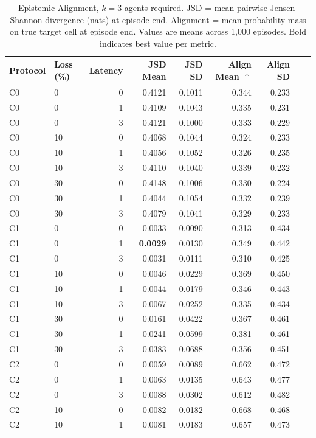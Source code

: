 \documentclass[pdflatex,sn-mathphys-num]{sn-jnl}%
\theoremstyle{thmstyleone}%
\theoremstyle{thmstyletwo}%
\theoremstyle{thmstylethree}%
\begin{document}
\begin{appendices}
\begin{table}
\centering
\caption{Epistemic Alignment, $k=3$ agents required. JSD = mean pairwise Jensen-Shannon divergence (nats) at episode end. Alignment = mean probability mass on true target cell at episode end. Values are means across 1,000 episodes. Bold indicates best value per metric.}
\label{tab:appendix_epistemic_b}
\small
\begin{tabular}{llrrrrrrr}
\toprule
Protocol & Loss (\%) & Latency & JSD Mean & JSD SD & Align Mean $\uparrow$ & Align SD \\
\midrule
C0 & 0 & 0 & 0.4121 & 0.1011 & 0.344 & 0.233 \\
C0 & 0 & 1 & 0.4109 & 0.1043 & 0.335 & 0.231 \\
C0 & 0 & 3 & 0.4121 & 0.1000 & 0.333 & 0.229 \\
C0 & 10 & 0 & 0.4068 & 0.1044 & 0.324 & 0.233 \\
C0 & 10 & 1 & 0.4056 & 0.1052 & 0.326 & 0.235 \\
C0 & 10 & 3 & 0.4110 & 0.1040 & 0.339 & 0.232 \\
C0 & 30 & 0 & 0.4148 & 0.1006 & 0.330 & 0.224 \\
C0 & 30 & 1 & 0.4044 & 0.1054 & 0.332 & 0.239 \\
C0 & 30 & 3 & 0.4079 & 0.1041 & 0.329 & 0.233 \\
\addlinespace[4pt]
C1 & 0 & 0 & 0.0033 & 0.0090 & 0.313 & 0.434 \\
C1 & 0 & 1 & \textbf{0.0029} & 0.0130 & 0.349 & 0.442 \\
C1 & 0 & 3 & 0.0031 & 0.0111 & 0.310 & 0.425 \\
C1 & 10 & 0 & 0.0046 & 0.0229 & 0.369 & 0.450 \\
C1 & 10 & 1 & 0.0044 & 0.0179 & 0.346 & 0.443 \\
C1 & 10 & 3 & 0.0067 & 0.0252 & 0.335 & 0.434 \\
C1 & 30 & 0 & 0.0161 & 0.0422 & 0.367 & 0.461 \\
C1 & 30 & 1 & 0.0241 & 0.0599 & 0.381 & 0.461 \\
C1 & 30 & 3 & 0.0383 & 0.0688 & 0.356 & 0.451 \\
\addlinespace[4pt]
C2 & 0 & 0 & 0.0059 & 0.0089 & 0.662 & 0.472 \\
C2 & 0 & 1 & 0.0063 & 0.0135 & 0.643 & 0.477 \\
C2 & 0 & 3 & 0.0088 & 0.0302 & 0.612 & 0.482 \\
C2 & 10 & 0 & 0.0082 & 0.0182 & 0.668 & 0.468 \\
C2 & 10 & 1 & 0.0081 & 0.0183 & 0.657 & 0.473 \\

\end{tabular}
\end{table}
\end{appendices}
\end{document}
